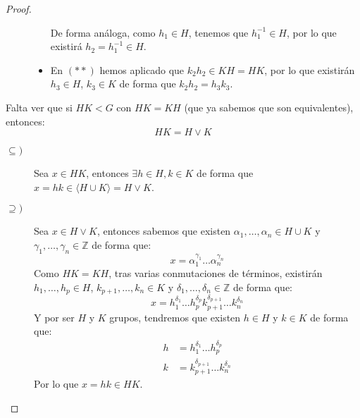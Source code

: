 \begin{prop}
\begin{proof}
\begin{description}
\begin{itemize}
                        De forma análoga, como $h_1\in H$, tenemos que $h_1^{-1}\in H$, por lo que existirá $h_2 = h_1^{-1}\in H$.
                    \item En $(\ast\ast)$ hemos aplicado que $k_2h_2 \in KH = HK$, por lo que existirán $h_3 \in H$, $k_3 \in K$ de forma que $k_2h_2 = h_3k_3$.
                \end{itemize}
        \end{description}
        Falta ver que si $HK < G$ con $HK = KH$ (que ya sabemos que son equivalentes), entonces:
        \begin{equation*}
            HK = H\lor K
        \end{equation*}
        \begin{description}
            \item [$\subseteq)$] Sea $x\in HK$, entonces $\exists h\in H, k\in K$ de forma que $x = hk\in \langle H\cup K \rangle = H\lor K$. 
            \item [$\supseteq)$] Sea $x\in H\lor K$, entonces sabemos que existen $\alpha_1,\ldots,\alpha_n \in H\cup K$ y $\gamma_1,\ldots,\gamma_n\in \mathbb{Z}$ de forma que:
                \begin{equation*}
                    x = \alpha_1^{\gamma_1}\ldots\alpha_n^{\gamma_n}
                \end{equation*}
                Como $HK = KH$, tras varias conmutaciones de términos, existirán ${h_1,\ldots,h_p \in H}$, $k_{p+1},\ldots,k_n\in K$ y $\delta_1,\ldots,\delta_n\in \mathbb{Z}$ de forma que:
                \begin{equation*}
                    x = h_1^{\delta_1}\ldots h_p^{\delta_p}k_{p+1}^{\delta_{p+1}}\ldots k_n^{\delta_n}
                \end{equation*}
                Y por ser $H$ y $K$ grupos, tendremos que existen $h\in H$ y $k\in K$ de forma que:
                \begin{align*}
                    h &= h_1^{\delta_1}\ldots h_p^{\delta_p} \\
                    k &= k_{p+1}^{\delta_{p+1}}\ldots k_n^{\delta_n}
                \end{align*}
                Por lo que $x=hk \in HK$. \qedhere
        \end{description}
    \end{proof}
\end{prop}

